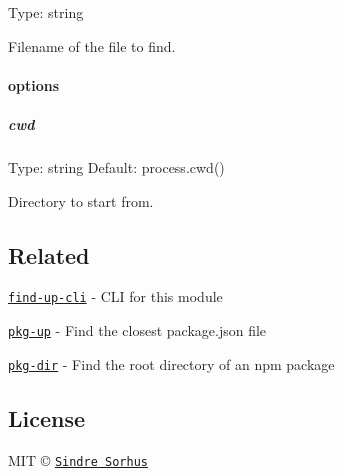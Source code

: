 Type\+: {\ttfamily string}

Filename of the file to find.

\paragraph*{options}

\subparagraph*{cwd}

Type\+: {\ttfamily string} Default\+: {\ttfamily process.\+cwd()}

Directory to start from.

\subsection*{Related}


\begin{DoxyItemize}
\item \href{https://github.com/sindresorhus/find-up-cli}{\tt find-\/up-\/cli} -\/ C\+LI for this module
\item \href{https://github.com/sindresorhus/pkg-up}{\tt pkg-\/up} -\/ Find the closest package.\+json file
\item \href{https://github.com/sindresorhus/pkg-dir}{\tt pkg-\/dir} -\/ Find the root directory of an npm package
\end{DoxyItemize}

\subsection*{License}

M\+IT © \href{http://sindresorhus.com}{\tt Sindre Sorhus} 